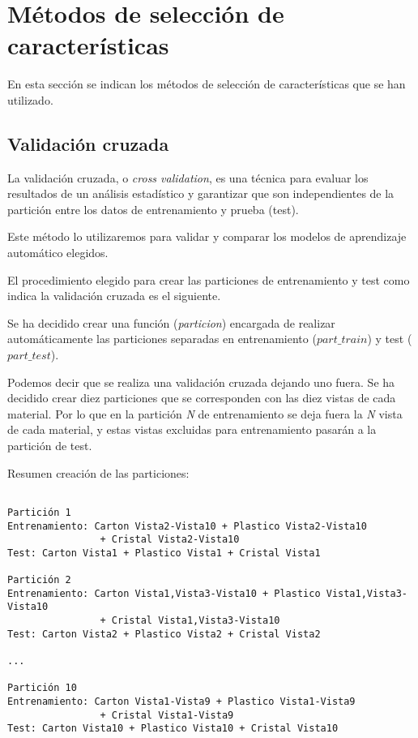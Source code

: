 \section{Métodos de selección de características}

En esta sección se indican los métodos de selección de características que se han utilizado.

\subsection{Validación cruzada}

La validación cruzada, o \textit{cross validation}, es una técnica para evaluar los resultados de un análisis estadístico y garantizar que son independientes de la partición entre los datos de entrenamiento y prueba (test).

Este método lo utilizaremos para validar y comparar los modelos de aprendizaje automático elegidos.

El procedimiento elegido para crear las particiones de entrenamiento y test como indica la validación cruzada es el siguiente.


Se ha decidido crear una función (\textit{particion}) encargada de realizar automáticamente las particiones separadas en entrenamiento ($part\_train$) y test ($part\_test$).

Podemos decir que se realiza una validación cruzada dejando uno fuera. Se ha decidido crear diez particiones que se corresponden con las diez vistas de cada material. Por lo que en la partición \textit{N} de entrenamiento se deja fuera la \textit{N} vista de cada material, y estas vistas excluidas para entrenamiento pasarán a la partición de test.

Resumen creación de las particiones:
\begin{verbatim}

Partición 1
Entrenamiento: Carton Vista2-Vista10 + Plastico Vista2-Vista10 
				+ Cristal Vista2-Vista10
Test: Carton Vista1 + Plastico Vista1 + Cristal Vista1

Partición 2
Entrenamiento: Carton Vista1,Vista3-Vista10 + Plastico Vista1,Vista3-Vista10 
				+ Cristal Vista1,Vista3-Vista10
Test: Carton Vista2 + Plastico Vista2 + Cristal Vista2

...

Partición 10
Entrenamiento: Carton Vista1-Vista9 + Plastico Vista1-Vista9 
				+ Cristal Vista1-Vista9
Test: Carton Vista10 + Plastico Vista10 + Cristal Vista10

\end{verbatim}

